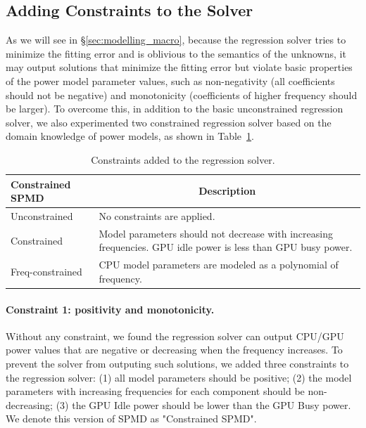 \subsection{Adding Constraints to the Solver}
\label{subsec:constraint}

As we will see in \S\ref{sec:modelling_macro}, because the regression
solver tries to minimize the fitting error and is oblivious to the
semantics of the unknowns, it may output solutions that minimize the
fitting error but violate basic properties of the power model
parameter values, such as non-negativity {\color{blue}(all coefficients should not be negative)} and monotonicity {\color{blue}(coefficients of higher frequency should be larger)}.  To overcome
this, in addition to the basic unconstrained regression solver, {\color{blue}we also experimented two constrained regression solver} based on the domain knowledge of power models, as shown in
Table~\ref{tab:constrained}.

\begin{table}[tp]
{\small
    \centering
    \caption{Constraints added to the regression solver.}
    \vspace{-0.1in}
    \begin{tabular}{|p{25mm}|p{52mm}|}
    \hline
         Constrained SPMD  & \multicolumn{1}{c|}{Description} \\
         \hline
\hline
         Unconstrained      & No constraints are applied. \\
\hline
         Constrained        & Model parameters should not decrease with increasing frequencies. GPU idle power is less than GPU busy power. \\
\hline
         Freq-constrained   & CPU model parameters are modeled as a polynomial of frequency. \\
         \hline
    \end{tabular}
    \label{tab:constrained}
    \vspace{-0.1in}
}
\end{table}


\paragraph{Constraint 1: positivity and monotonicity.}
Without any constraint, we found the regression solver can output
CPU/GPU power values that are negative or decreasing when the
frequency increases.  To prevent the solver from outputing such
solutions, we added three constraints to the regression solver: (1) all
model parameters should be positive; (2) the model parameters with
increasing frequencies for each component should be non-decreasing;
(3) the GPU Idle power should be lower than the GPU Busy power.  We
denote this version of SPMD as "Constrained SPMD".


